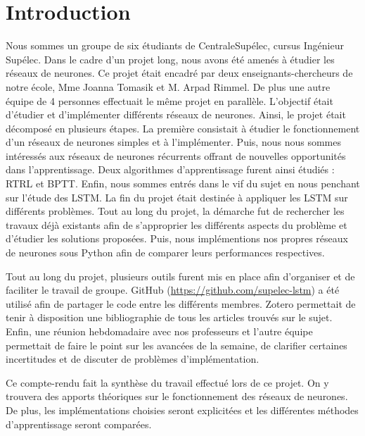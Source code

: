 \chapter*{Introduction}

Nous sommes un groupe de six étudiants de CentraleSupélec, cursus Ingénieur Supélec. Dans le cadre d'un projet long, nous avons été amenés à étudier les réseaux de neurones. Ce projet était encadré par deux enseignants-chercheurs de notre école, Mme Joanna Tomasik et M. Arpad Rimmel. De plus une autre équipe de 4 personnes effectuait le même projet en parallèle. L'objectif était d'étudier et d'implémenter différents réseaux de neurones. Ainsi, le projet était décomposé en plusieurs étapes. La première consistait à étudier le fonctionnement d'un réseaux de neurones simples et à l'implémenter. Puis, nous nous sommes intéressés aux réseaux de neurones récurrents offrant de nouvelles opportunités dans l'apprentissage. Deux algorithmes d'apprentissage furent ainsi étudiés : RTRL et BPTT. Enfin, nous sommes entrés dans le vif du sujet en nous penchant sur l'étude des LSTM. La fin du projet était destinée à appliquer les LSTM sur différents problèmes. Tout au long du projet, la démarche fut de rechercher les travaux déjà existants afin de s'approprier les différents aspects du problème et d'étudier les solutions proposées. Puis, nous implémentions nos propres réseaux de neurones sous Python afin de comparer leurs performances respectives.

Tout au long du projet, plusieurs outils furent mis en place afin d'organiser et de faciliter le travail de groupe. GitHub (\url{https://github.com/supelec-lstm}) a été utilisé afin de partager le code entre les différents membres. Zotero permettait de tenir à disposition une bibliographie de tous les articles trouvés sur le sujet. Enfin, une réunion hebdomadaire avec nos professeurs et l'autre équipe permettait de faire le point sur les avancées de la semaine, de clarifier certaines incertitudes et de discuter de problèmes d'implémentation.

Ce compte-rendu fait la synthèse du travail effectué lors de ce projet. On y trouvera des apports théoriques sur le fonctionnement des réseaux de neurones. De  plus, les implémentations choisies seront explicitées et les différentes méthodes d'apprentissage seront comparées.
